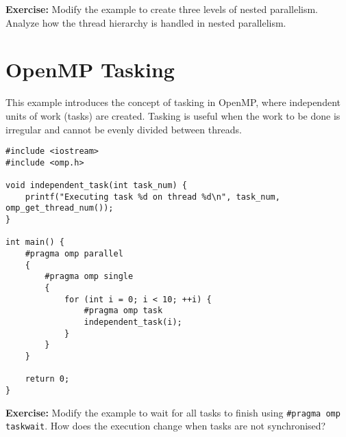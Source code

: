 \documentclass{article}
\begin{document}
\textbf{Exercise:} Modify the example to create three levels of nested parallelism. Analyze how the thread hierarchy is handled in nested parallelism.

\section*{OpenMP Tasking}
This example introduces the concept of tasking in OpenMP, where independent units of work (tasks) are created. Tasking is useful when the work to be done is irregular and cannot be evenly divided between threads.

\begin{verbatim}
#include <iostream>
#include <omp.h>

void independent_task(int task_num) {
    printf("Executing task %d on thread %d\n", task_num, omp_get_thread_num());
}

int main() {
    #pragma omp parallel
    {
        #pragma omp single
        {
            for (int i = 0; i < 10; ++i) {
                #pragma omp task
                independent_task(i);
            }
        }
    }

    return 0;
}
\end{verbatim}

\textbf{Exercise:} Modify the example to wait for all tasks to finish using \texttt{\#pragma omp taskwait}. How does the execution change when tasks are not synchronised?
\end{document}
